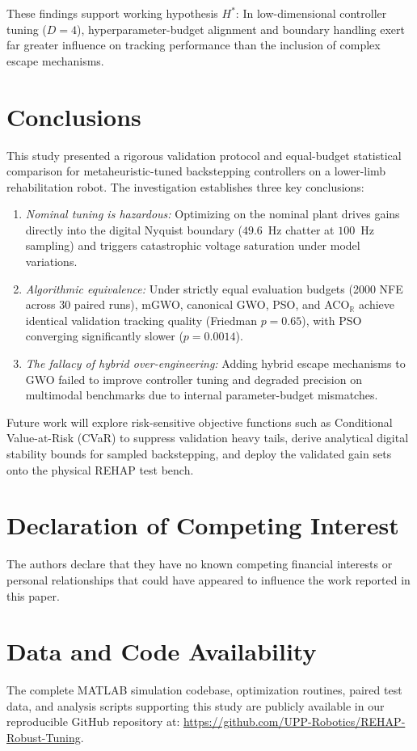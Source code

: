 \documentclass[a4paper,fleqn]{cas-dc}
\newcommand{\mgwo}{mGWO}
\newcommand{\acor}{ACO$_\mathbb{R}$}
\newcommand{\rehap}{REHAP}
\begin{document}
These findings support working hypothesis $H^\ast$: In low-dimensional controller tuning ($D=4$), hyperparameter-budget alignment and boundary handling exert far greater influence on tracking performance than the inclusion of complex escape mechanisms.

\section{Conclusions}\label{sec:concl}
This study presented a rigorous validation protocol and equal-budget statistical comparison for metaheuristic-tuned backstepping controllers on a lower-limb rehabilitation robot. The investigation establishes three key conclusions:
\begin{enumerate}
\item \emph{Nominal tuning is hazardous:} Optimizing on the nominal plant drives gains directly into the digital Nyquist boundary ($49.6$~Hz chatter at $100$~Hz sampling) and triggers catastrophic voltage saturation under model variations.
\item \emph{Algorithmic equivalence:} Under strictly equal evaluation budgets (2000 NFE across 30 paired runs), \mgwo{}, canonical GWO, PSO, and \acor{} achieve identical validation tracking quality (Friedman $p=0.65$), with PSO converging significantly slower ($p=0.0014$).
\item \emph{The fallacy of hybrid over-engineering:} Adding hybrid escape mechanisms to GWO failed to improve controller tuning and degraded precision on multimodal benchmarks due to internal parameter-budget mismatches.
\end{enumerate}

Future work will explore risk-sensitive objective functions such as Conditional Value-at-Risk (CVaR) to suppress validation heavy tails, derive analytical digital stability bounds for sampled backstepping, and deploy the validated gain sets onto the physical \rehap{} test bench.

\printcredits

\section*{Declaration of Competing Interest}
The authors declare that they have no known competing financial interests or personal relationships that could have appeared to influence the work reported in this paper.

\section*{Data and Code Availability}
The complete MATLAB simulation codebase, optimization routines, paired test data, and analysis scripts supporting this study are publicly available in our reproducible GitHub repository at: \url{https://github.com/UPP-Robotics/REHAP-Robust-Tuning}.

\printcredits



\end{document}
